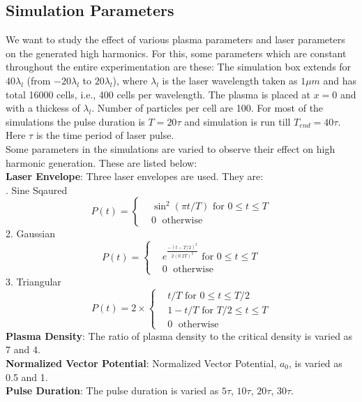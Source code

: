 \documentclass[12pt]{article}
\newenvironment{changemargin}[2]{
\begin{list}{}{
\setlength{\topsep}{0pt}
\setlength{\leftmargin}{#1}
\setlength{\rightmargin}{#2}
\setlength{\listparindent}{\parindent}
\setlength{\itemindent}{\parindent}
\setlength{\parsep}{\parskip}
}
\item[]}{\end{list}}
\begin{document}
\begin{changemargin}{-2cm}{-2cm}
    \subsection{Simulation Parameters}
    We want to study the effect of various plasma parameters and laser parameters on the generated high harmonics. For this, some parameters which are constant throughout the entire experimentation are these:
    The simulation box extends for $40 \lambda _l$ (from $-20 \lambda _l$ to $20 \lambda _l$), where $\lambda_l$ is the laser wavelength taken as $1\mu m$ and has total 16000 cells, i.e., 400 cells per wavelength. The plasma is placed at $x=0$ and with a thickess of $\lambda_l$. Number of particles per cell are 100.
    For most of the simulations the pulse duration is $T = 20 \tau$ and simulation is run till $T_{end} = 40 \tau$. Here $\tau$ is the time period of laser pulse.\\
    Some parameters in the simulations are varied to observe their effect on high harmonic generation. These are listed below:\\
    \textbf{Laser Envelope}:
    Three laser envelopes are used. They are:\\
    . Sine Sqaured
    \begin{equation}\label{sin-sq-env}
        P(t)=
        \begin{cases}
             & \sin^2(\pi t/T) \text{ for } 0 \leq t \le T \\
             & 0         \;      \text{ otherwise }
        \end{cases}
    \end{equation}
    2. Gaussian
    \begin{equation}\label{gaussian-env}
        P(t)=
        \begin{cases}
             & e^{\frac{-(t-T/2)^2}{2(0.2T)^2}} \text{ for } 0 \leq t \le T \\
             & 0         \;      \text{ otherwise }
        \end{cases}
    \end{equation}
    3. Triangular
    \begin{equation}\label{triangle-env}
        P(t)= 2\times
        \begin{cases}
             & t/T \text{ for } 0 \leq t \le T/2    \\
             & 1-t/T \text{ for } T/2 \leq t \le T  \\
             & 0         \;      \text{ otherwise }
        \end{cases}
    \end{equation}
    \noindent
    \textbf{Plasma Density}:
    The ratio of plasma density to the critical density is varied as $7$ and $4$.\\
    \noindent
    \textbf{Normalized Vector Potential}:
    Normalized Vector Potential, $a_0$, is varied as 0.5 and 1.\\
    \noindent
    \textbf{Pulse Duration}:
    The pulse duration is varied as $5\tau$, $10\tau$, $20\tau$, $30\tau$.


\end{changemargin}
\end{document}
